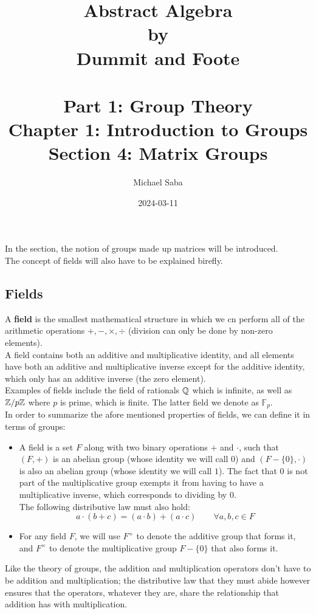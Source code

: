 \documentclass[12pt]{article}
\title{%
    \Huge Abstract Algebra \\
    \large by \\
    \Large Dummit and Foote \\~\\
    \huge Part 1: Group Theory \\
    \LARGE Chapter 1: Introduction to Groups \\
    \Large Section 4: Matrix Groups
}
\date{2024-03-11}
\author{Michael Saba}
\begin{document}
    \maketitle
    \newpage
    \setlength{\parindent}{0pt}

    In the section, the notion of groups made up matrices
    will be introduced. \\
    The concept of fields will also have to be explained birefly. \\

    \subsection*{Fields}

    A \textbf{field} is the smallest mathematical structure
    in which we cn perform
    all of the arithmetic operations $+, -, \times, \div$ 
    (division can only be done by non-zero elements). \\
    A field contains both an additive and multiplicative identity,
    and all elements have both an additive and multiplicative inverse
    except for the additive identity,
    which only has an additive inverse
    (the zero element). \\
    Examples of fields include the field of rationals $\mathbb{Q}$
    which is infinite,
    as well as $\mathbb{Z}/p\mathbb{Z}$ where $p$ is prime,
    which is finite.
    The latter field we denote as $\mathbb{F}_p$. \\

    In order to summarize the afore mentioned properties of fields,
    we can define it in terms of groups:
    \begin{itemize}[label=$\diamond$]
        \item 
            A field is a set $F$
            along with two binary operations $+$ and $\cdot$,
            such that $(F, +)$ is an abelian group
            (whose identity we will call $0$)
            and $(F - \{0\}, \cdot)$ is also an abelian group
            (whose identity we will call $1$).
            The fact that $0$ is not part of the multiplicative group
            exempts it from having to have a multiplicative inverse,
            which corresponds to dividing by $0$. \\
            The following distributive law must also hold: 
            \[ a \cdot (b + c) = (a \cdot b) + (a \cdot c)
            \qquad \forall a, b, c \in F \]
        \item 
            For any field $F$,
            we will use $F^+$ to denote the additive group that forms it,
            and $F^\times$ to denote the multiplicative group $F - \{0\}$
            that also forms it.
    \end{itemize}
    Like the theory of groups,
    the addition and multiplication operators don't have to be
    addition and multiplication;
    the distributive law that they must abide however ensures
    that the operators, whatever they are,
    share the relationship that addition has with multiplication. \\
\end{document}
